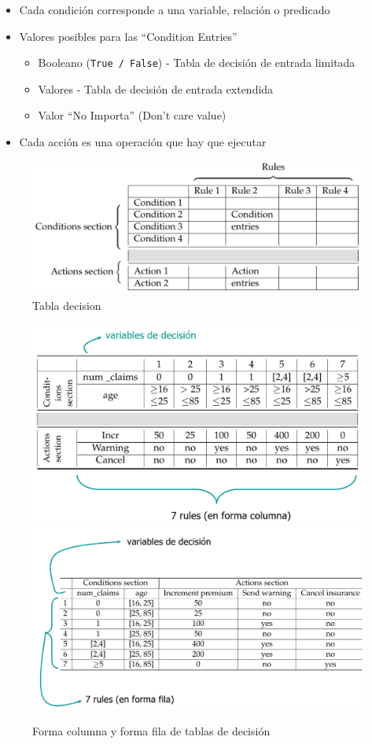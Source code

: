 \begin{paracol}{2}
   \begin{itemize}
   	\item Cada condición corresponde a una variable, relación o predicado
	\item Valores posibles para las ``Condition Entries''
 \begin{itemize}
 	\item Booleano (\lstinline|True / False|) - Tabla de decisión de entrada limitada
	\item Valores - Tabla de decisión de entrada extendida
	\item Valor ``No Importa'' (Don't care value)

 \end{itemize}
\item Cada acción es una operación que hay que ejecutar

   \end{itemize}
\switchcolumn
\begin{figure}[htbp]
   \centering
   \includegraphics{images/05/tabladecision.png}
   \caption{Tabla decision }
   \label{fig:05/tabladecision}
\end{figure}
\end{paracol}

\begin{figure}[htbp]
   \centering
   \includegraphics{images/05/tablaForma1.png}
   \includegraphics{images/05/tablaForma2.png}
   \caption{Forma columna y forma fila de tablas de decisión}
   \label{fig:05/tablaForma}
\end{figure}